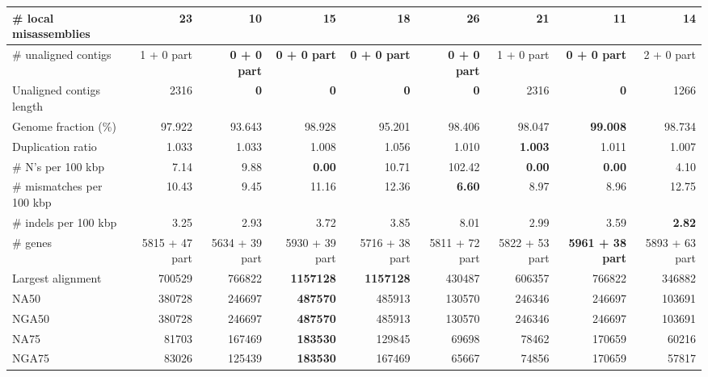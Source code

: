 \documentclass[12pt,a4paper]{article}
\begin{document}
\begin{table}[ht]
\begin{center}
\begin{tabular}{|l*{8}{|r}|}
\# local misassemblies & 23 & {\bf 10} & 15 & 18 & 26 & 21 & 11 & 14 \\ \hline
\# unaligned contigs & 1 + 0 part & {\bf 0 + 0 part} & {\bf 0 + 0 part} & {\bf 0 + 0 part} & {\bf 0 + 0 part} & 1 + 0 part & {\bf 0 + 0 part} & 2 + 0 part \\ \hline
Unaligned contigs length & 2316 & {\bf 0} & {\bf 0} & {\bf 0} & {\bf 0} & 2316 & {\bf 0} & 1266 \\ \hline
Genome fraction (\%) & 97.922 & 93.643 & 98.928 & 95.201 & 98.406 & 98.047 & {\bf 99.008} & 98.734 \\ \hline
Duplication ratio & 1.033 & 1.033 & 1.008 & 1.056 & 1.010 & {\bf 1.003} & 1.011 & 1.007 \\ \hline
\# N's per 100 kbp & 7.14 & 9.88 & {\bf 0.00} & 10.71 & 102.42 & {\bf 0.00} & {\bf 0.00} & 4.10 \\ \hline
\# mismatches per 100 kbp & 10.43 & 9.45 & 11.16 & 12.36 & {\bf 6.60} & 8.97 & 8.96 & 12.75 \\ \hline
\# indels per 100 kbp & 3.25 & 2.93 & 3.72 & 3.85 & 8.01 & 2.99 & 3.59 & {\bf 2.82} \\ \hline
\# genes & 5815 + 47 part & 5634 + 39 part & 5930 + 39 part & 5716 + 38 part & 5811 + 72 part & 5822 + 53 part & {\bf 5961 + 38 part} & 5893 + 63 part \\ \hline
Largest alignment & 700529 & 766822 & {\bf 1157128} & {\bf 1157128} & 430487 & 606357 & 766822 & 346882 \\ \hline
NA50 & 380728 & 246697 & {\bf 487570} & 485913 & 130570 & 246346 & 246697 & 103691 \\ \hline
NGA50 & 380728 & 246697 & {\bf 487570} & 485913 & 130570 & 246346 & 246697 & 103691 \\ \hline
NA75 & 81703 & 167469 & {\bf 183530} & 129845 & 69698 & 78462 & 170659 & 60216 \\ \hline
NGA75 & 83026 & 125439 & {\bf 183530} & 167469 & 65667 & 74856 & 170659 & 57817 \\ \hline
\end{tabular}
\end{center}
\end{table}
\end{document}
